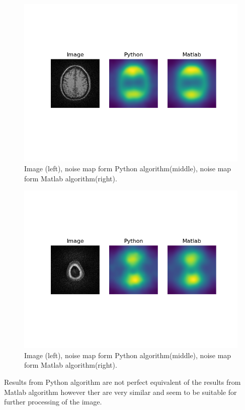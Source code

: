 \begin{figure}[H]
	\centering{}
		\includegraphics[scale=0.7]{figures/module03/110_comp}
	\caption{Image (left), noise map form Python algorithm(middle), noise map form Matlab algorithm(right).} 
\end{figure}
\begin{figure}[H]
	\centering{}
		\includegraphics[scale=0.7]{figures/module03/160_comp}
	\caption{Image (left), noise map form Python algorithm(middle), noise map form Matlab algorithm(right).} 
\end{figure}
Results from Python algorithm are not perfect equivalent of the results from Matlab algorithm however ther are very similar and seem to be suitable for 
further processing of the image.